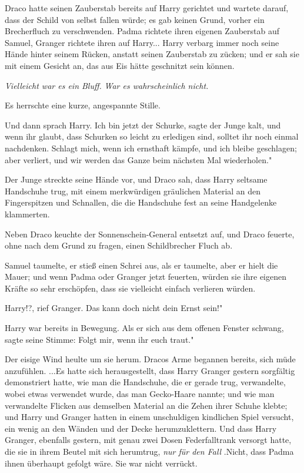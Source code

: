 Draco hatte seinen Zauberstab bereits auf Harry gerichtet und wartete darauf,
dass der Schild von selbst fallen würde; es gab keinen Grund, vorher ein
Brecherfluch zu verschwenden. Padma richtete ihren eigenen Zauberstab auf
Samuel, Granger richtete ihren auf Harry... Harry verbarg immer noch seine Hände
hinter seinem Rücken, anstatt seinen Zauberstab zu zücken; und er sah sie mit
einem Gesicht an, das aus Eis hätte geschnitzt sein können.

\emph{Vielleicht war es ein Bluff.}
\emph{War es wahrscheinlich nicht.}

Es herrschte eine kurze, angespannte Stille.

Und dann sprach Harry. \glqq{}Ich bin jetzt der Schurke\grqq{}, sagte der Junge
kalt, \glqq{}und wenn ihr glaubt, dass Schurken so leicht zu erledigen sind,
solltet ihr noch einmal nachdenken. Schlagt mich, wenn ich ernsthaft kämpfe, und
ich bleibe geschlagen; aber verliert, und wir werden das Ganze beim nächsten Mal
wiederholen."

Der Junge streckte seine Hände vor, und Draco sah, dass Harry seltsame
Handschuhe trug, mit einem merkwürdigen gräulichen Material an den Fingerspitzen
und Schnallen, die die Handschuhe fest an seine Handgelenke klammerten.

Neben Draco keuchte der Sonnenschein-General entsetzt auf, und Draco feuerte,
ohne nach dem Grund zu fragen, einen Schildbrecher Fluch ab.

Samuel taumelte, er stieß einen Schrei aus, als er taumelte, aber er hielt die
Mauer; und wenn Padma oder Granger jetzt feuerten, würden sie ihre eigenen
Kräfte so sehr erschöpfen, dass sie vielleicht einfach verlieren würden.

\glqq{}Harry!?\grqq{}, rief Granger. \glqq{}Das kann doch nicht dein Ernst sein!"

Harry war bereits in Bewegung. Als er sich aus dem offenen Fenster schwang,
sagte seine Stimme: \glqq{}Folgt mir, wenn ihr euch traut."

Der eisige Wind heulte um sie herum. Dracos Arme begannen bereits, sich müde
anzufühlen. ...Es hatte sich herausgestellt, dass Harry Granger gestern
sorgfältig demonstriert hatte, wie man die Handschuhe, die er gerade trug,
verwandelte, wobei etwas verwendet wurde, das man \glqq{}Gecko-Haare\grqq{}
nannte; und wie man verwandelte Flicken aus demselben Material an die Zehen
ihrer Schuhe klebte; und Harry und Granger hatten in einem unschuldigen
kindlichen Spiel versucht, ein wenig an den Wänden und der Decke
herumzuklettern. Und dass Harry Granger, ebenfalls gestern, mit genau zwei Dosen
Federfalltrank versorgt hatte, die sie in ihrem Beutel mit sich herumtrug,
\emph{\glqq{}nur für den Fall\grqq{}} .Nicht, dass Padma ihnen überhaupt gefolgt
wäre. Sie war nicht verrückt.

